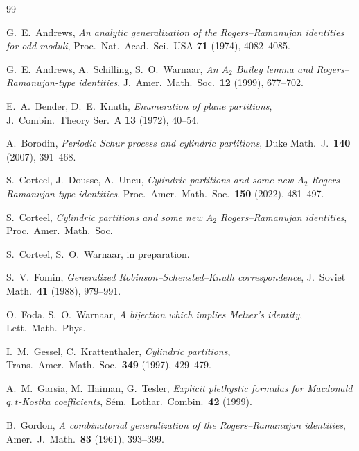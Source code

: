 \documentclass[11pt]{report}
\theoremstyle{plain}
\theoremstyle{definition}
\begin{document}

\begin{thebibliography}{99}


  G.~E.~Andrews,
  \emph{An analytic generalization of the Rogers--Ramanujan
  identities for odd moduli},
  Proc.\ Nat.\ Acad.\ Sci.\ USA \textbf{71} (1974), 4082--4085.

  G.~E.~Andrews, A.~Schilling, S.~O.~Warnaar,
  \emph{An $A_2$ Bailey lemma and Rogers--Ramanujan-type
  identities},
  J.~Amer.\ Math.\ Soc.\ \textbf{12} (1999), 677--702.

  E.~A.~Bender, D.~E.~Knuth,
  \emph{Enumeration of plane partitions},
  J.~Combin.\ Theory Ser.~A \textbf{13} (1972), 40--54.

  A.~Borodin,
  \emph{Periodic Schur process and cylindric partitions},
  Duke Math.~J.\ \textbf{140} (2007), 391--468.

  S.~Corteel, J.~Dousse, A.~Uncu,
  \emph{Cylindric partitions and some new $A_2$
  Rogers--Ramanujan type identities},
  Proc.\ Amer.\ Math.\ Soc.\ \textbf{150} (2022), 481--497.

  S.~Corteel,
  \emph{Cylindric partitions and some new $A_2$
  Rogers--Ramanujan identities},
  Proc.\ Amer.\ Math.\ Soc.

  S.~Corteel, S.~O.~Warnaar,
  in preparation.

  S.~V.~Fomin,
  \emph{Generalized Robinson--Schensted--Knuth
  correspondence},
  J.~Soviet Math.\ \textbf{41} (1988), 979--991.

  O.~Foda, S.~O.~Warnaar,
  \emph{A bijection which implies Melzer's identity},
  Lett.\ Math.\ Phys.

  I.~M.~Gessel, C.~Krattenthaler,
  \emph{Cylindric partitions},
  Trans.\ Amer.\ Math.\ Soc.\ \textbf{349} (1997), 429--479.

  A.~M.~Garsia, M.~Haiman, G.~Tesler,
  \emph{Explicit plethystic formulas for Macdonald
  $q,t$-Kostka coefficients},
  S\'em.\ Lothar.\ Combin.\ \textbf{42} (1999).

  B.~Gordon,
  \emph{A combinatorial generalization of the
  Rogers--Ramanujan identities},
  Amer.\ J.\ Math.\ \textbf{83} (1961), 393--399.


\end{thebibliography}
\end{document}
